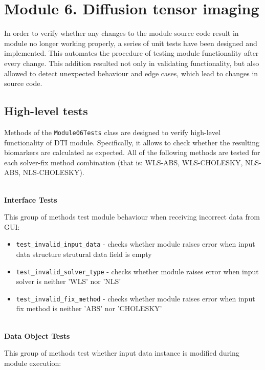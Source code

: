 \section{Module 6. Diffusion tensor imaging}

In order to verify whether any changes to the module source code result in module no longer working properly, a series of unit tests have been designed and implemented. This automates the procedure of testing module functionality after every change. This addition resulted not only in validating functionality, but also allowed to detect unexpected behaviour and edge cases, which lead to changes in source code.

\subsection{High-level tests}

Methods of the \texttt{Module06Tests} class are designed to verify high-level functionality of DTI module. Specifically, it allows to check whether the resulting biomarkers are calculated as expected. All of the following methods are tested for each solver-fix method combination (that is: WLS-ABS, WLS-CHOLESKY, NLS-ABS, NLS-CHOLESKY).

\hfill\\
\textbf{Interface Tests}
\hfill

This group of methods test module behaviour when receiving incorrect data from GUI:

\begin{itemize}
	\item 
	\texttt{test\_invalid\_input\_data} - checks whether module raises error when input data structure strutural data field is empty
	
	\item 
	\texttt{test\_invalid\_solver\_type} - checks whether module raises error when input solver is neither 'WLS' nor 'NLS'
	
	\item 
	\texttt{test\_invalid\_fix\_method} - checks whether module raises error when input fix method is neither 'ABS' nor 'CHOLESKY'
\end{itemize}

\hfill\\
\textbf{Data Object Tests}
\hfill

This group of methods test whether input data instance is modified during module execution:

